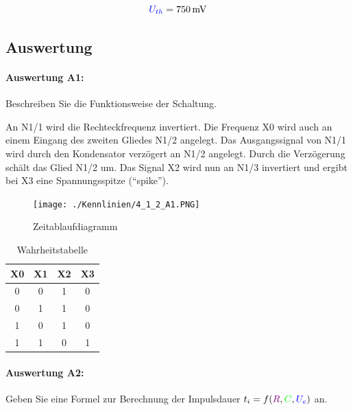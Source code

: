 \documentclass[a4paper,titlepage,parskip]{scrreprt}
\newcommand{\spannung}[1]{\textcolor{blue}{#1}}
\newcommand{\widerstand}[1]{\textcolor{violet}{#1}}
\newcommand{\capacity}[1]{\textcolor{green}{#1}}
\begin{document}
          \begin{equation*}
            \spannung{U_{th}} = \SI{750}{\milli\volt}
          \end{equation*}

      \subsection{Auswertung}
        \paragraph{Auswertung A1:} Beschreiben Sie die Funktionsweise der Schaltung.
        
            An N1/1 wird die Rechteckfrequenz invertiert. Die Frequenz X0 wird auch an einem Eingang des zweiten Gliedes N1/2 angelegt. Das Ausgangssignal von N1/1 wird durch den Kondensator verzögert an N1/2 angelegt. Durch die Verzögerung schält das Glied N1/2 um. Das Signal X2 wird nun an N1/3 invertiert und ergibt bei X3 eine Spannungsspitze ("`spike"').
             \begin{figure}[!htbp]
                \begin{center}
                    \texttt{[image: ./Kennlinien/4\_1\_2\_A1.PNG]}
                \end{center}
                \caption{Zeitablaufdiagramm}
            \end{figure}
              \begin{center}
                \begin{table}[!hbtp]
                    \caption{Wahrheitstabelle}
                    \renewcommand{\arraystretch}{1.3}
                    \begin{center}
                        \begin{tabular}{cccc}
                            X0 & X1 & X2 & X3\\ \hline
                            0 & 0 & 1 & 0\\
                            0 & 1 & 1 & 0\\
                            1 & 0 & 1 & 0\\
                            1 & 1 & 0 & 1
                        \end{tabular}
                    \end{center}
                \end{table}
            \end{center}

          
        \paragraph{Auswertung A2:} Geben Sie eine Formel zur Berechnung der Impulsdauer $t_i = f(\widerstand{R}, \capacity{C}, \spannung{U_e})$ an.
\end{document}
